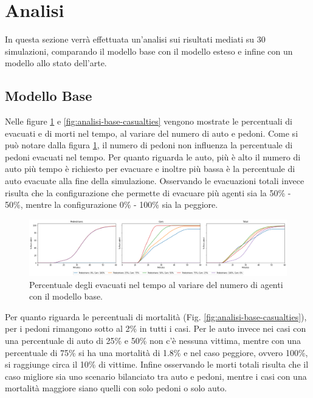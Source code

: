 \section{Analisi}
\label{sec:analisi}
In questa sezione verrà effettuata un'analisi sui risultati mediati su 30 simulazioni, 
comparando il modello base con il modello esteso e infine con un modello allo stato dell'arte.

\subsection{Modello Base}
Nelle figure \ref{fig:analisi-base-evacuated} e \ref{fig:analisi-base-casualties} vengono mostrate le percentuali di evacuati 
e di morti nel tempo, al variare del numero di auto e pedoni.
%
Come si può notare dalla figura \ref{fig:analisi-base-evacuated}, il numero di pedoni non influenza la percentuale di pedoni evacuati nel tempo.
%
Per quanto riguarda le auto, più è alto il numero di auto più tempo è richiesto per evacuare e inoltre più bassa è la percentuale di auto evacuate alla fine della simulazione.
%
Osservando le evacuazioni totali invece risulta che la configurazione che permette di evacuare più agenti sia la 50\% - 50\%, mentre la configurazione 0\% - 100\% sia la peggiore.

\begin{figure}[ht]
    \centering
    \includegraphics[width=\textwidth]{images/analisi/base-evacuated.png}
    \caption{Percentuale degli evacuati nel tempo al variare del numero di agenti con il modello base.}
    \label{fig:analisi-base-evacuated}
\end{figure}

Per quanto riguarda le percentuali di mortalità (Fig. \ref{fig:analisi-base-casualties}), per i pedoni rimangono sotto al 2\% in tutti i casi.
%
Per le auto invece nei casi con una percentuale di auto di 25\% e 50\% non c'è nessuna vittima, mentre 
con una percentuale di 75\% si ha una mortalità di 1.8\% e nel caso peggiore, ovvero 100\%, si raggiunge circa il 10\% di vittime.
%
Infine osservando le morti totali risulta che il caso migliore sia uno scenario bilanciato tra auto e pedoni, 
mentre i casi con una mortalità maggiore siano quelli con solo pedoni o solo auto.

